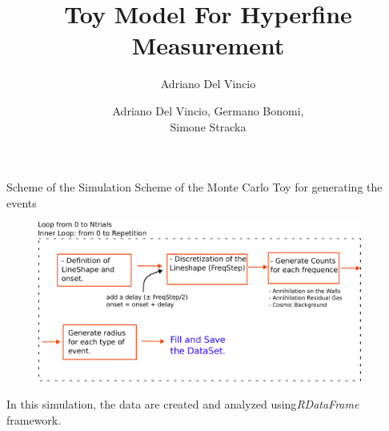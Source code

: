 \documentclass[9pt]{beamer}
\author{Adriano Del Vincio}
\title[Alpha 2]{Toy Model For Hyperfine Measurement}
\author[Adriano, Germano, Simone]{Adriano Del Vincio, Germano Bonomi,\\ Simone Stracka}
\institute[]{University of Brescia, INFN Pisa}
\begin{document}
\begin{frame}
\titlepage
\end{frame}


\begin{frame}{Scheme of the Simulation}
Scheme of the Monte Carlo Toy for generating the events

\begin{figure}
\centering
\includegraphics[width = 0.95\textwidth]{SimulationScheme.pdf}
\end{figure}

\begin{center}
In this simulation, the data are created and analyzed using\newline \textit{RDataFrame} framework.
\end{center}

\end{frame}
\end{document}
